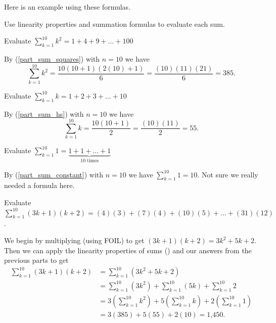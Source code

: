 Here is an example using these formulas.

\begin{exam}
\label{exam_sum_formulas}
   Use linearity properties and summation formulas to evaluate each sum.
       \begin{apart}
           \item Evaluate $\displaystyle \sum_{k=1}^{10}k^2=1 + 4 + 9 + \ldots + 100$
               \begin{soln}
                   By  (\ref{part_sum_squares}) with $n=10$ we have
                       $$\sum_{k=1}^{10}k^2 = \frac{10(10+1)(2(10)+1)}{6} = \frac{(10)(11)(21)}{6} = 385.$$
               \end{soln} 
           \item Evaluate $\displaystyle \sum_{k=1}^{10}k= 1 + 2 + 3 + \ldots + 10$          
               \begin{soln}
                   By  (\ref{part_sum_hs}) with $n=10$ we have
                    $$\sum_{k=1}^{10}k= \frac{10(10+1)}{2} = \frac{(10)(11)}{2} = 55.$$
               \end{soln} 
            \item Evaluate $\displaystyle \sum_{k=1}^{10}1=\underbrace{1+1+\ldots+1}_{10 \text{ times}}$
                \begin{soln}
                    By  (\ref{part_sum_constant}) with $n=10$ we have $\displaystyle \sum_{k=1}^{10}1=10.$
                    Not sure we really needed a formula here.
                \end{soln}
            \item Evaluate $\displaystyle \sum_{k=1}^{10}(3k+1)(k+2)=(4)(3)+(7)(4)+(10)(5) + \ldots + (31)(12)$.
               \begin{soln}
                   We begin by multiplying (using FOIL) to get $(3k+1)(k+2) = 3k^2+5k+2$. Then we can apply the linearity properties of sums () and our answers from the previous parts to get
                       \begin{align*}
                           \sum_{k=1}^{10}(3k+1)(k+2) 
                           & =\sum_{k=1}^{10} (3k^2+5k+2) \\
                           & = \sum_{k=1}^{10}(3k^2)+\sum_{k=1}^{10}(5k)+\sum_{k=1}^{10}2 \\
                           & = 3\left(\sum_{k=1}^{10}k^2\right)+5\left(\sum_{k=1}^{10}k\right)+2\left(\sum_{k=1}^{10}1\right) \\
                           & = 3(385) + 5(55)+2(10) = \text{1,450}.
                       \end{align*}
           \end{soln}
       \end{apart}
\end{exam}


